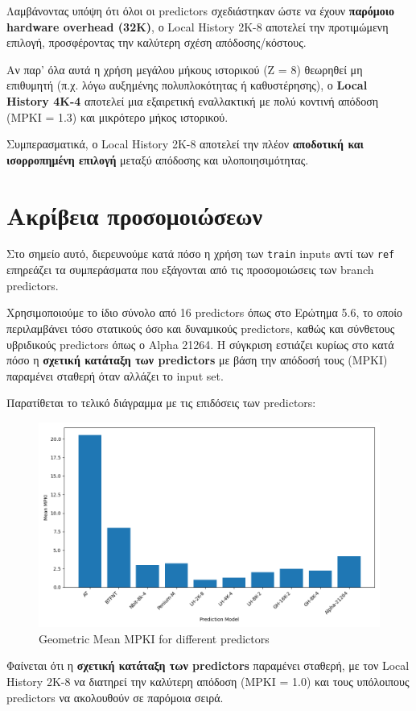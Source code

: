 \documentclass{article}
\begin{document}
Λαμβάνοντας υπόψη ότι όλοι οι predictors σχεδιάστηκαν ώστε να έχουν \textbf{παρόμοιο hardware overhead (32Κ)}, ο Local History 2K-8 αποτελεί την προτιμώμενη επιλογή, προσφέροντας την καλύτερη σχέση απόδοσης/κόστους. 

Αν παρ' όλα αυτά η χρήση μεγάλου μήκους ιστορικού (Ζ = 8) θεωρηθεί μη επιθυμητή (π.χ. λόγω αυξημένης πολυπλοκότητας ή καθυστέρησης), ο \textbf{Local History 4K-4} αποτελεί μια εξαιρετική εναλλακτική με πολύ κοντινή απόδοση (MPKI = 1.3) και μικρότερο μήκος ιστορικού.

\bigskip
Συμπερασματικά, ο Local History 2K-8 αποτελεί την πλέον \textbf{αποδοτική και ισορροπημένη επιλογή} μεταξύ απόδοσης και υλοποιησιμότητας.

\section{Ακρίβεια προσομοιώσεων}

Στο σημείο αυτό, διερευνούμε κατά πόσο η χρήση των \texttt{train} inputs αντί των \texttt{ref} επηρεάζει τα συμπεράσματα που εξάγονται από τις προσομοιώσεις των branch predictors.

Χρησιμοποιούμε το ίδιο σύνολο από 16 predictors όπως στο Ερώτημα 5.6, το οποίο περιλαμβάνει τόσο στατικούς όσο και δυναμικούς predictors, καθώς και σύνθετους υβριδικούς predictors όπως ο Alpha 21264. Η σύγκριση εστιάζει κυρίως στο κατά πόσο η \textbf{σχετική κατάταξη των predictors} με βάση την απόδοσή τους (MPKI) παραμένει σταθερή όταν αλλάζει το input set.

Παρατίθεται το τελικό διάγραμμα με τις επιδόσεις των predictors:

\begin{figure}[H]
    \centering
    \includegraphics[width=1\textwidth]{figures/5_6/geom_mean.png}
    \caption{Geometric Mean MPKI for different predictors}
    \label{fig:mean_mpkis_predictors}
\end{figure}

Φαίνεται ότι η \textbf{σχετική κατάταξη των predictors} παραμένει σταθερή, με τον Local History 2K-8 να διατηρεί την καλύτερη απόδοση (MPKI = 1.0) και τους υπόλοιπους predictors να ακολουθούν σε παρόμοια σειρά.
\end{document}
